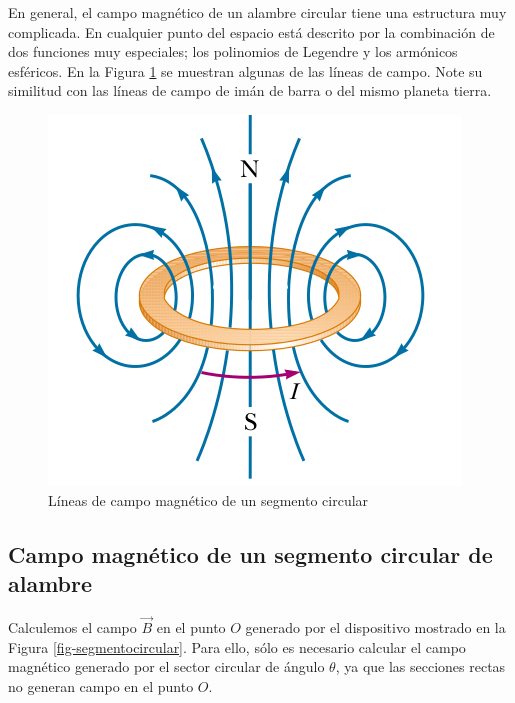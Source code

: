 En general, el campo magnético de un alambre circular tiene una estructura muy complicada. En cualquier punto del espacio está descrito por la combinación de dos funciones muy especiales; los polinomios de Legendre y los armónicos esféricos. En la Figura \ref{fig-campomagneticoalambrecircular2} se muestran algunas de las líneas de campo. Note su similitud con las líneas de campo de imán de barra o del mismo planeta tierra.
 
\begin{figure}[h]
\begin{center}
\includegraphics[scale=0.4]{magnetostatica/campomagneticoanillo}
\end{center}
\caption{Líneas de campo magnético de un segmento circular}
\label{fig-campomagneticoalambrecircular2}
\end{figure}

\subsection*{Campo magnético de un segmento circular de alambre}

Calculemos el campo $\vec{B}$ en el punto $O$ generado por el dispositivo mostrado en la Figura \ref{fig-segmentocircular}. Para ello, sólo es necesario calcular el campo magnético generado por el sector circular de ángulo $\theta$, ya que las secciones rectas no generan campo en el punto $O$.

